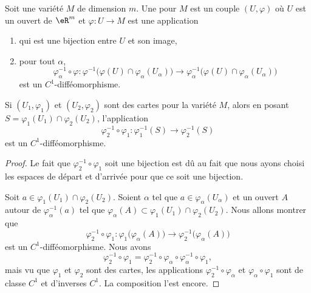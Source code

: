 \begin{definition}      \label{DEFooWABZooGIEDEV}
	Soit une variété \( M\) de dimension \( m\). Une  pour \( M\) est un couple \( (U,\varphi)\) où \( U\) est un ouvert de \( \eR^m\) et \( \varphi\colon U\to M\) est une application
	\begin{enumerate}
		\item
		      qui est une bijection entre \( U\) et son image,
		\item
		      pour tout \( \alpha\),
		      \begin{equation}
			      \varphi_{\alpha}^{-1}\circ \varphi\colon \varphi^{-1}\big( \varphi(U)\cap\varphi_{\alpha}(U_{\alpha}) \big)\to \varphi_{\alpha}^{-1}\big( \varphi(U)\cap\varphi_{\alpha}(U_{\alpha}) \big)
		      \end{equation}
		      est un \( C^1\)-difféomorphisme.
	\end{enumerate}
\end{definition}

\begin{proposition}
	Si \( (U_1,\varphi_1)\) et \( (U_2,\varphi_2)\) sont des cartes pour la variété \( M\), alors en posant \( S=\varphi_1(U_1)\cap \varphi_2(U_2)\), l'application
	\begin{equation}
		\varphi_2^{-1}\circ\varphi_1\colon \varphi_1^{-1}(S)\to \varphi_2^{-1}(S)
	\end{equation}
	est un \( C^1\)-difféomorphisme.
\end{proposition}

\begin{proof}
	Le fait que \( \varphi_2^{-1}\circ\varphi_1\) soit une bijection est dû au fait que nous ayons choisi les espaces de départ et d'arrivée pour que ce soit une bijection.

	Soit \( a\in \varphi_1(U_1)\cap\varphi_2(U_2)\). Soient \( \alpha\) tel que \( a\in\varphi_{\alpha}(U_{\alpha})\) et un ouvert \( A\) autour de \( \varphi_{\alpha}^{-1}(a)\) tel que \( \varphi_{\alpha}(A)\subset \varphi_1(U_1)\cap \varphi_2(U_2)\). Nous allons montrer que
	\begin{equation}
		\varphi_2^{-1}\circ \varphi_1\colon \varphi_1\big( \varphi_{\alpha}(A) \big)\to \varphi_2^{-1}\big( \varphi_{\alpha}(A) \big)
	\end{equation}
	est un \( C^1\)-difféomorphisme. Nous avons
	\begin{equation}
		\varphi_2^{-1}\circ\varphi_1=\varphi_2^{-1}\circ\varphi_{\alpha}\circ\varphi_{\alpha}^{-1}\circ\varphi_1,
	\end{equation}
	mais vu que \( \varphi_1\) et \( \varphi_2\) sont des cartes, les applications \( \varphi_2^{-1}\circ\varphi_{\alpha}\) et \( \varphi_{\alpha}\circ \varphi_1\) sont de classe \( C^1\) et d'inverses \( C^1\). La composition l'est encore.
\end{proof}

